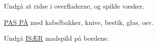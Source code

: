 \documentclass{article}
\begin{document}
\maketitle

\null
\vspace{-1cm}

\begin{center}

\vspace{-1cm}



\vspace{-0.8cm}

\Huge


Undgå at ridse i overfladerne, og spilde væsker.

\underline{PAS PÅ} med kabelbakker, knive, bestik, glas, osv.

Undgå \underline{ISÆR} madspild på bordene.


\english






\end{center}

\dansk

\underskriv
\end{document}
